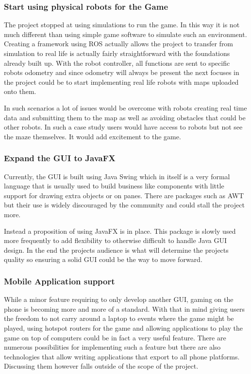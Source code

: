     \subsubsection{Start using physical robots for the Game}
      The project stopped at using simulations to run the game. In this way it is not much different than using simple game software to simulate such an environment. Creating a framework using ROS actually allows the project to transfer from simulation to real life is actually fairly straightforward with the foundations already built up. With the robot controller, all functions are sent to specific robots odometry and since odometry will always be present the next focuses in the project could be to start implementing real life robots with maps uploaded onto them.

      In such scenarios a lot of issues would be overcome with robots creating real time data and submitting them to the map as well as avoiding obstacles that could be other robots. In such a case study users would have access to robots but not see the maze themselves. It would add excitement to the game.

    \subsubsection{Expand the GUI to JavaFX}
      Currently, the GUI is built using Java Swing which in itself is a very formal language that is usually used to build business like components with little support for drawing extra objects or on panes. There are packages such as AWT but their use is widely discouraged by the community and could stall the project more.

      Instead a proposition of using JavaFX is in place. This package is slowly used more frequently to add flexibility to otherwise difficult to handle Java GUI design. In the end the projects audience is what will determine the projects quality so ensuring a solid GUI could be the way to move forward.

    \subsubsection{Mobile Application support}
      While a minor feature requiring to only develop another GUI, gaming on the phone is becoming more and more of a standard. With that in mind giving users the freedom to not carry around a laptop to events where the game might be played, using hotspot routers for the game and allowing applications to play the game on top of computers could be in fact a very useful feature. There are numerous possibilities for implementing such a feature but there are also technologies that allow writing applications that export to all phone platforms. Discussing them however falls outside of the scope of the project.

